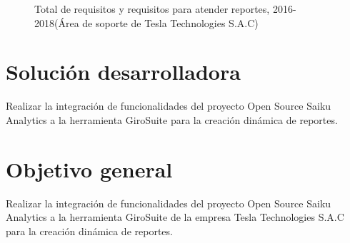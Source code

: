 \begin{spacing}{1.5}
	\begin{figure}[H]
		\begin{center}
			\tikzI
		\end{center}
		\caption {\centering \small{Total de requisitos y requisitos para atender reportes,  2016-2018(\'{A}rea de soporte de Tesla Technologies S.A.C)}} \label{figure:chaperI_1}
	\end{figure}
	
\end{spacing}

\section{Soluci\'{o}n desarrolladora}
\begin{spacing}{1.5}
	Realizar la integraci\'{o}n de funcionalidades del proyecto Open Source Saiku Analytics a la herramienta GiroSuite para la creaci\'{o}n din\'{a}mica de reportes.
\end{spacing}
\section{Objetivo general}
	Realizar la integraci\'{o}n de funcionalidades del proyecto Open Source Saiku Analytics a la herramienta GiroSuite de la empresa Tesla Technologies S.A.C para la creaci\'{o}n din\'{a}mica de reportes.
\begin{spacing}{1.5}
\end{spacing}
